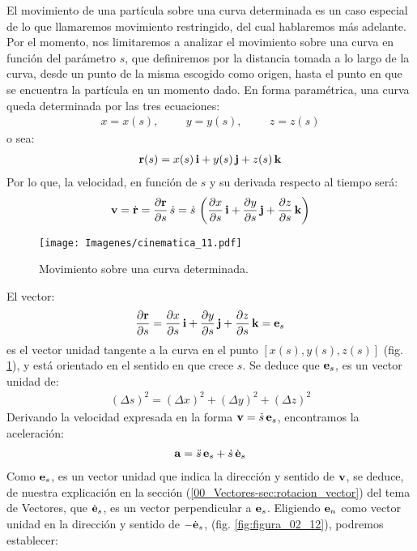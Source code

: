 El movimiento de una partícula sobre una curva determinada es un caso especial de lo que llamaremos movimiento restringido, del cual hablaremos más adelante. Por el momento, nos limitaremos a analizar el movimiento sobre una curva en función del parámetro $s$, que definiremos por la distancia tomada a lo largo de la curva, desde un punto de la misma escogido como origen, hasta el punto en que se encuentra la partícula en un momento dado. En forma paramétrica, una curva queda determinada por las tres ecuaciones:
\begin{align*}
    x = x (s), \hspace{1cm} y = y (s), \hspace{1cm} z = z (s)
\end{align*}
o sea:
\begin{align}
    \vb{r} (s) = x (s) \, \vb{i} + y (s) \, \vb{j} + z (s) \, \vb{k}
    \label{eq:ecuacion_02_96}
\end{align}
Por lo que, la velocidad, en función de $s$ y su derivada respecto al tiempo será:
\begin{align}
    \vb{v} = \dot{\vb{r}} = \pdv{\vb{r}}{s} \, \dot{s} = \dot{s} \, \left( \pdv{x}{s} \, \vb{i} + \pdv{y}{s} \, \vb{j} + \pdv{z}{s} \, \vb{k} \right)
    \label{eq:ecuacion_02_97}
\end{align}
\begin{figure}[H]
    \centering
    \texttt{[image: Imagenes/cinematica\_11.pdf]}
    \caption{Movimiento sobre una curva determinada.}
    \label{fig:figura_02_11}
\end{figure}
El vector:
\begin{align*}
    \pdv{\vb{r}}{s} = \pdv{x}{s} \, \vb{i} + \pdv{y}{s} \, \vb{j} + \pdv{z}{s} \, \vb{k} = \vb{e}_{s}
\end{align*}
es el vector unidad tangente a la curva en el punto $\left[ x (s), y (s), z (s) \right]$ (fig. \ref{fig:figura_02_11}), y está orientado en el sentido en que crece $s$. Se deduce que $\vb{e}_{s}$, es un vector unidad de:
\begin{align*}
    \left( \Delta s \right)^{2} = \left( \Delta x \right)^{2} + \left( \Delta y \right)^{2} + \left( \Delta z \right)^{2}
\end{align*}
Derivando la velocidad expresada en la forma $\vb{v} = \dot{s} \, \vb{e}_{s}$, encontramos la aceleración:
\begin{align}
    \vb{a} = \ddot{s} \, \vb{e}_{s} + \dot{s} \, \dot{\vb{e}}_{s}
    \label{eq:ecuacion_02_98}
\end{align}
Como $\vb{e}_{s}$, es un vector unidad que indica la dirección y sentido de $\vb{v}$, se deduce, de nuestra explicación en la sección (\ref{00_Vectores-sec:rotacion_vector}) del tema de Vectores, que $\dot{\vb{e}}_{s}$, es un vector perpendicular a $\vb{e}_{s}$. Eligiendo $\vb{e}_{n}$ como vector unidad en la dirección y sentido de $-\dot{\vb{e}}_{s}$, (fig. \ref{fig:figura_02_12}), podremos establecer:
